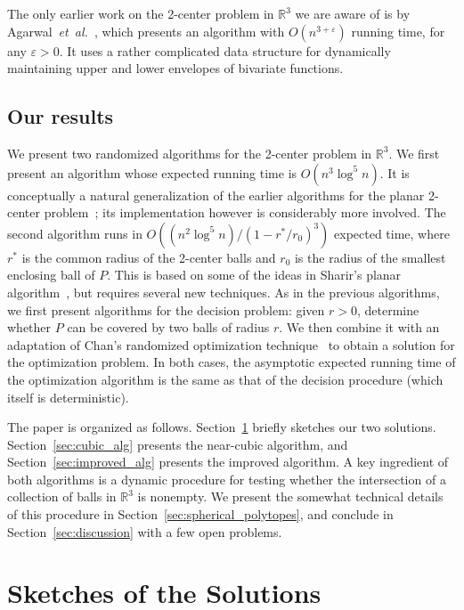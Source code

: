 \documentclass[a4paper,12pt]{article}
\def\reals{\mathbb{R}}
\def\etal{\textsl{et~al.}}
\begin{document}
The only earlier work on the 2-center problem in $\reals^3$ we are aware of is by Agarwal~\etal~\cite{AES},
which presents an algorithm with $O(n^{3+\varepsilon})$ running time, for any $\varepsilon > 0$. It uses
a rather complicated data structure for dynamically maintaining upper and lower envelopes of bivariate functions.

\subsection{Our results}
\label{subsec:results} We present two randomized algorithms for the
2-center problem in $\reals^3$. We first present an algorithm whose
expected running time is $O(n^3 \log^5 n)$. It is conceptually a
natural generalization of the earlier algorithms for the planar
2-center problem~\cite{ASP, DE, JK}; its implementation however is
considerably more involved. The second algorithm runs in $O((n^2
\log^5 n) /(1-r^*/r_0)^3)$ expected time, where $r^*$ is the common
radius of the 2-center balls and $r_0$ is the radius of the smallest
enclosing ball of $P$.  This is based on some of the ideas in
Sharir's planar algorithm~\cite{MS}, but requires several new
techniques. As in the previous algorithms, we first present
algorithms for the decision problem: given $r > 0$, determine
whether $P$ can be covered by two balls of radius $r$. We then
combine it with an adaptation of Chan's randomized optimization
technique~\cite{TCG} to obtain a solution for the optimization
problem. In both cases, the asymptotic expected running time of the
optimization algorithm is the same as that of the decision procedure
(which itself is deterministic).

The paper is organized as follows. Section~\ref{sec:sketches}
briefly sketches our two solutions. Section~\ref{sec:cubic_alg}
presents the near-cubic algorithm, and
Section~\ref{sec:improved_alg} presents the improved algorithm. A
key ingredient of both algorithms is a dynamic procedure for testing
whether the intersection of a collection of balls in $\mathbb{R}^3$
is nonempty. We present the somewhat technical details of this
procedure in Section~\ref{sec:spherical_polytopes}, and conclude in
Section~\ref{sec:discussion} with a few open problems.

\section{Sketches of the Solutions}
\label{sec:sketches}
\end{document}
